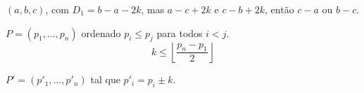 $(a, b, c)$, com $D_1 = b - a - 2k$, mas $a - c + 2k$ e $c - b + 2k$, então $c - a$ ou $b - c$.

$P = (p_1, \ldots, p_n)$ ordenado $p_i \leq p_j$ para todos $i < j$.
\[
    k \leq \left\lfloor \frac{p_n - p_1}{2} \right\rfloor
\]

$P' = (p'_1, \ldots, p'_n)$ tal que $p'_i = p_i \pm k$.

